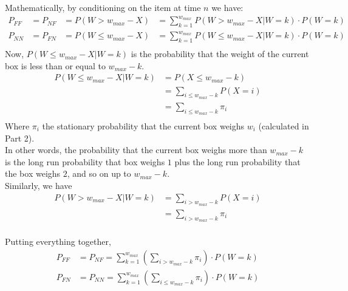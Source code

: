\documentclass[10pt,a4paper]{article}
\begin{document}
Mathematically, by conditioning on the item at time $ n $ we have:\\
\begin{align*}
P_{FF} &= P_{NF} &= P(W > w_{max} -X) &= \sum\limits_{k=1}^{w_{max}} P(W > w_{max} -X | W=k)\cdot P(W=k)  \\
P_{NN} &= P_{FN} &= P(W \leq w_{max} -X) &=\sum\limits_{k=1}^{w_{max}} P(W \leq w_{max} -X | W=k)\cdot P(W=k) \\
\end{align*}
Now, $ P(W \leq w_{max} -X | W=k) $ is the probability that the weight of the current box is less than or equal to $ w_{max} - k $. \\
\begin{align*}
P(W \leq w_{max} - X| W=k) &= P(X \leq w_{max} -k)\\
&= \sum_{i \leq w_{max}-k} P(X = i) \\
&= \sum_{i \leq w_{max} - k} \pi_i \\
\end{align*}
Where $\pi_i$ the stationary probability that the current box weighs $w_i$ (calculated in Part 2). \\
In other words, the probability that the current box weighs more than $ w_{max} - k $ is the long run probability that box weighs $1$ plus the long run probability that the box weighs $2$, and so on up to $ w_{max} - k $. \\

Similarly, we have \\
\begin{align*}
P(W > w_{max} -X | W=k) &= \sum_{i > w_{max}-k} P(X = i)\\ 
&= \sum_{i > w_{max} -k} \pi_i \\
\end{align*}

Putting everything together, \\
\begin{align*}
P_{FF} &= P_{NF} = \sum\limits_{k=1}^{w_{max}} \left(\sum_{i > w_{max} -k} \pi_i \right) \cdot P(W=k)  \\
P_{FN} &= P_{NN} = \sum\limits_{k=1}^{w_{max}} \left(\sum_{i \leq w_{max} -k} \pi_i \right) \cdot P(W=k) \\
\end{align*}
\end{document}
